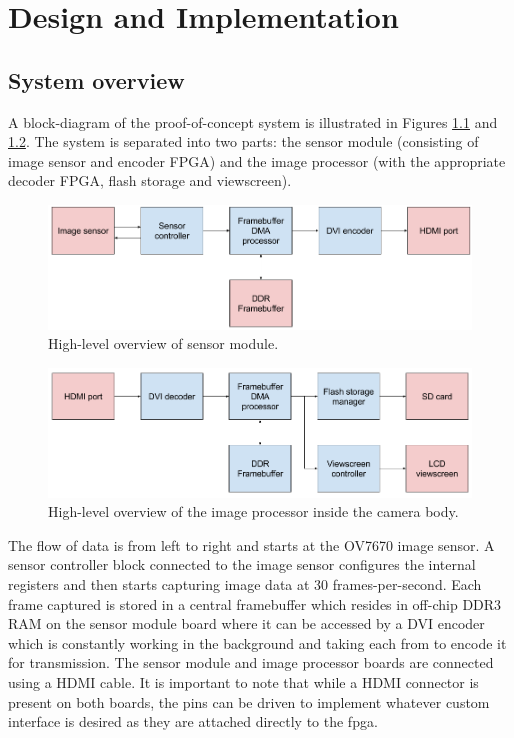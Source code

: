 \chapter{Design and Implementation}

\section{System overview}

A block-diagram of the proof-of-concept system is illustrated in Figures \ref{fig:sensor_module_diagram} and \ref{fig:image_processor_diagram}. The system is separated into two parts: the sensor module (consisting of image sensor and encoder FPGA) and the image processor (with the appropriate decoder FPGA, flash storage and viewscreen).

\begin{figure}
  \centering
  \includegraphics[width=1\textwidth]{./img/sensor_module_diagram.png}
  \caption{High-level overview of sensor module.}
  \label{fig:sensor_module_diagram}
\end{figure}

\begin{figure}
  \centering
  \includegraphics[width=1\textwidth]{./img/image_processor_diagram.png}
  \caption{High-level overview of the image processor inside the camera body.}
  \label{fig:image_processor_diagram}
\end{figure}

The flow of data is from left to right and starts at the OV7670 image sensor. A sensor controller block connected to the image sensor configures the internal registers and then starts capturing image data at 30 frames-per-second. Each frame captured is stored in a central framebuffer which resides in off-chip DDR3 RAM on the sensor module board where it can be accessed by a DVI encoder which is constantly working in the background and taking each from to encode it for transmission. The sensor module and image processor boards are connected using a HDMI cable. It is important to note that while a HDMI connector is present on both boards, the pins can be driven to implement whatever custom interface is desired as they are attached directly to the \gls{fpga}.


